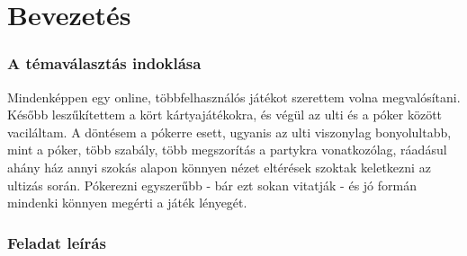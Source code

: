 \part{Bevezetés}

\section{A témaválasztás indoklása}
Mindenképpen egy online, többfelhasználós játékot szerettem volna megvalósítani. Később leszűkítettem a kört kártyajátékokra, és végül az ulti és a póker között vaciláltam. A döntésem a pókerre esett, ugyanis az ulti viszonylag bonyolultabb, mint a póker, több szabály, több megszorítás a partykra vonatkozólag, ráadásul ahány ház annyi szokás alapon könnyen nézet eltérések szoktak keletkezni az ultizás során. Pókerezni egyszerűbb - bár ezt sokan vitatják - és jó formán mindenki könnyen megérti a játék lényegét.

\section{Feladat leírás}

\clearpage
